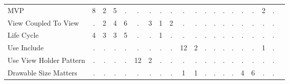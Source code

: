 \begin{table*}[t]
\begin{tabular}{p{4cm}|p{.3cm}p{.3cm}p{.3cm}p{.3cm}p{.3cm}p{.3cm}p{.3cm}p{.3cm}p{.3cm}p{.4cm}p{.4cm}p{.4cm}p{.4cm}p{.4cm}p{.4cm}p{.4cm}p{.4cm}p{.4cm}p{.4cm}}
MVP													& \multicolumn{1}{c}{8}	& \multicolumn{1}{c}{2}	& \multicolumn{1}{c}{5}	& \multicolumn{1}{c}{.}	& \multicolumn{1}{c}{.}	& \multicolumn{1}{c}{.}	& \multicolumn{1}{c}{.}	& \multicolumn{1}{c}{.}	& \multicolumn{1}{c}{.}	& \multicolumn{1}{c}{.}	& \multicolumn{1}{c}{.}	& \multicolumn{1}{c}{.}	& \multicolumn{1}{c}{.}	& \multicolumn{1}{c}{.}	& \multicolumn{1}{c}{.}	& \multicolumn{1}{c}{.}	& \multicolumn{1}{c}{2}	& \multicolumn{1}{c}{.} 		 \\
View Coupled To View								& \multicolumn{1}{c}{.}	& \multicolumn{1}{c}{2}	& \multicolumn{1}{c}{4}	& \multicolumn{1}{c}{6}	& \multicolumn{1}{c}{.}	& \multicolumn{1}{c}{3}	& \multicolumn{1}{c}{1}	& \multicolumn{1}{c}{2}	& \multicolumn{1}{c}{.}	& \multicolumn{1}{c}{.}	& \multicolumn{1}{c}{.}	& \multicolumn{1}{c}{.}	& \multicolumn{1}{c}{.}	& \multicolumn{1}{c}{.}	& \multicolumn{1}{c}{.}	& \multicolumn{1}{c}{.}	& \multicolumn{1}{c}{.}	& \multicolumn{1}{c}{.} 		 \\
Life Cycle											& \multicolumn{1}{c}{4}	& \multicolumn{1}{c}{3}	& \multicolumn{1}{c}{3}	& \multicolumn{1}{c}{5}	& \multicolumn{1}{c}{.}	& \multicolumn{1}{c}{.}	& \multicolumn{1}{c}{1}	& \multicolumn{1}{c}{.}	& \multicolumn{1}{c}{.}	& \multicolumn{1}{c}{.}	& \multicolumn{1}{c}{.}	& \multicolumn{1}{c}{.}	& \multicolumn{1}{c}{.}	& \multicolumn{1}{c}{.}	& \multicolumn{1}{c}{.}	& \multicolumn{1}{c}{.}	& \multicolumn{1}{c}{.}	& \multicolumn{1}{c}{.} 		 \\
Use Include											& \multicolumn{1}{c}{.}	& \multicolumn{1}{c}{.}	& \multicolumn{1}{c}{.}	& \multicolumn{1}{c}{.}	& \multicolumn{1}{c}{.}	& \multicolumn{1}{c}{.}	& \multicolumn{1}{c}{.}	& \multicolumn{1}{c}{.}	& \multicolumn{1}{c}{12}	& \multicolumn{1}{c}{2}	& \multicolumn{1}{c}{.}	& \multicolumn{1}{c}{.}	& \multicolumn{1}{c}{.}	& \multicolumn{1}{c}{.}	& \multicolumn{1}{c}{.}	& \multicolumn{1}{c}{.}	& \multicolumn{1}{c}{1}	& \multicolumn{1}{c}{.} 	 \\
Use View Holder Pattern								& \multicolumn{1}{c}{.}	& \multicolumn{1}{c}{.}	& \multicolumn{1}{c}{.}	& \multicolumn{1}{c}{.}	& \multicolumn{1}{c}{12}	& \multicolumn{1}{c}{2}	& \multicolumn{1}{c}{.}	& \multicolumn{1}{c}{.}	& \multicolumn{1}{c}{.}	& \multicolumn{1}{c}{.}	& \multicolumn{1}{c}{.}	& \multicolumn{1}{c}{.}	& \multicolumn{1}{c}{.}	& \multicolumn{1}{c}{.}	& \multicolumn{1}{c}{.}	& \multicolumn{1}{c}{.}	& \multicolumn{1}{c}{.}	& \multicolumn{1}{c}{.} 	 \\
Drawable Size Matters								& \multicolumn{1}{c}{.}	& \multicolumn{1}{c}{.}	& \multicolumn{1}{c}{.}	& \multicolumn{1}{c}{.}	& \multicolumn{1}{c}{.}	& \multicolumn{1}{c}{.}	& \multicolumn{1}{c}{.}	& \multicolumn{1}{c}{.}	& \multicolumn{1}{c}{1}	& \multicolumn{1}{c}{1}	& \multicolumn{1}{c}{.}	& \multicolumn{1}{c}{.}	& \multicolumn{1}{c}{.}	& \multicolumn{1}{c}{.}	& \multicolumn{1}{c}{4}	& \multicolumn{1}{c}{6}	& \multicolumn{1}{c}{.}	& \multicolumn{1}{c}{.} 		 \\

\end{tabular}
\end{table*}
